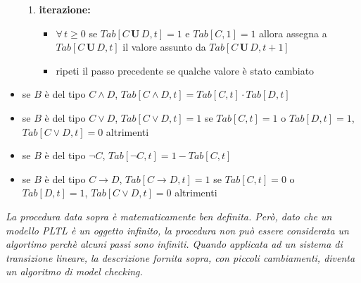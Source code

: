 \documentclass[a4paper,12pt, oneside]{book}
\begin{document}
\begin{itemize}
\begin{enumerate}
    \item \textbf{iterazione:}
    \begin{itemize}
      \item $\forall\,t\geq 0$ se $Tab[C\,\mathbf{U}\,D, t] = 1$ e
      $Tab[C,1]=1$ allora assegna a $Tab[C\,\mathbf{U}\,D, t]$ il valore
      assunto da $Tab[C\,\mathbf{U}\,D, t+1]$ 
      \item ripeti il passo precedente se qualche valore è stato cambiato
    \end{itemize}
  \end{enumerate}
  \item se $B$ è del tipo $C \land D$, $Tab[C \land D, t] = Tab[C, t] \cdot
  Tab[D, t]$  
  \item se $B$ è del tipo $C \lor D$, $Tab[C \lor D, t] = 1$ se $Tab[C, t] = 1$ o
  $Tab[D, t] = 1$, $Tab[C \lor D, t] = 0$ altrimenti
  \item se $B$ è del tipo $\neg C$, $Tab[\neg C, t] = 1 − Tab[C, t]$
  \item se $B$ è del tipo $C \to D$, $Tab[C \to D, t] = 1$ se $Tab[C, t] = 0$ o
  $Tab[D, t] = 1$, $Tab[C \lor D, t] = 0$ altrimenti
\end{itemize}
\textit{La procedura data sopra è matematicamente ben definita. Però, dato che
  un modello PLTL è un oggetto infinito, la procedura non può essere considerata
  un algortimo perchè alcuni passi sono infiniti. Quando applicata ad un sistema
  di transizione lineare, la descrizione fornita sopra, con piccoli cambiamenti,
  diventa un algoritmo di model checking.}
\end{document}
